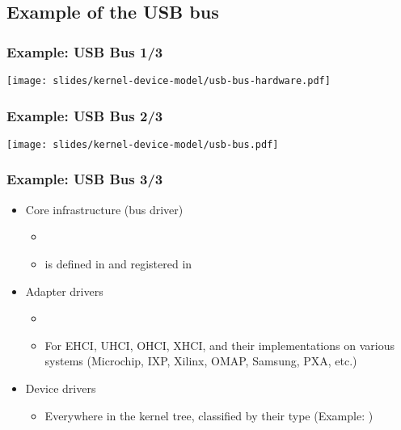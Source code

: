\subsection{Example of the USB bus}

\begin{frame}
\frametitle{Example: USB Bus 1/3}
  \begin{center}
    \texttt{[image: slides/kernel-device-model/usb-bus-hardware.pdf]}
  \end{center}
\end{frame}

\begin{frame}
\frametitle{Example: USB Bus 2/3}
  \begin{center}
    \texttt{[image: slides/kernel-device-model/usb-bus.pdf]}
  \end{center}
\end{frame}

\begin{frame}
  \frametitle{Example: USB Bus 3/3}
  \begin{itemize}
  \item Core infrastructure (bus driver)
    \begin{itemize}
    \item {}
    \item {} is defined in
       and registered in
    \end{itemize}
  \item Adapter drivers
    \begin{itemize}
    \item {}
    \item For EHCI, UHCI, OHCI, XHCI, and their implementations on
      various systems (Microchip, IXP, Xilinx, OMAP, Samsung, PXA, etc.)
    \end{itemize}
  \item Device drivers
    \begin{itemize}
    \item Everywhere in the kernel tree, classified by their type
    (Example: )
    \end{itemize}
  \end{itemize}
\end{frame}

